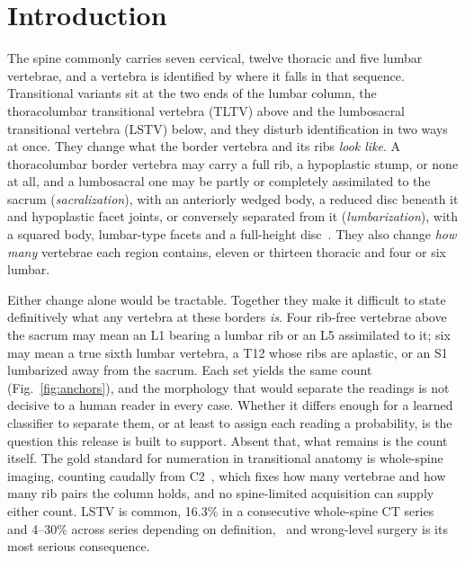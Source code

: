 \documentclass[aapm,mph,amsmath,amssymb,reprint]{revtex4-2}
\begin{document}
\maketitle

\section{Introduction}

The spine commonly carries seven cervical, twelve thoracic and five lumbar vertebrae, and a
vertebra is identified by where it falls in that sequence. Transitional variants sit at the
two ends of the lumbar column, the thoracolumbar transitional vertebra (TLTV) above and the
lumbosacral transitional vertebra (LSTV) below, and they disturb identification in two
ways at once. They change what the border vertebra and its ribs \emph{look like}. A thoracolumbar border vertebra may carry a full rib, a hypoplastic stump, or none at all, and
a lumbosacral one may be partly or completely assimilated to the sacrum
(\emph{sacralization}), with an anteriorly wedged body, a reduced disc beneath it and
hypoplastic facet joints, or conversely separated from it (\emph{lumbarization}), with a
squared body, lumbar-type facets and a full-height disc~\cite{koninwalz2010}. They also
change \emph{how many} vertebrae each region contains, eleven or thirteen thoracic and four or six lumbar.

Either change alone would be tractable. Together they make it difficult to state definitively
what any vertebra at these borders \emph{is}. Four rib-free vertebrae above the sacrum may mean
an L1 bearing a lumbar rib or an L5 assimilated to it; six may mean a true sixth lumbar
vertebra, a T12 whose ribs are aplastic, or an S1 lumbarized away from the sacrum. Each
set yields the same count (Fig.~\ref{fig:anchors}), and the morphology that would
separate the readings is not
decisive to a human reader in every case. Whether it differs enough for a learned classifier to separate them, or at
least to assign each reading a probability, is the question this release is built to
support. Absent that, what remains is the count itself. The gold standard for numeration in
transitional anatomy is whole-spine imaging, counting caudally from C2~\cite{lian2018},
which fixes how many vertebrae and how many rib pairs the column holds, and no
spine-limited acquisition can supply either count. LSTV is common, 16.3\%
in a consecutive whole-spine CT series~\cite{nagata2025} and 4--30\% across series
depending on definition,~\cite{koninwalz2010,lian2018} and wrong-level surgery is its most
serious consequence.
\end{document}
